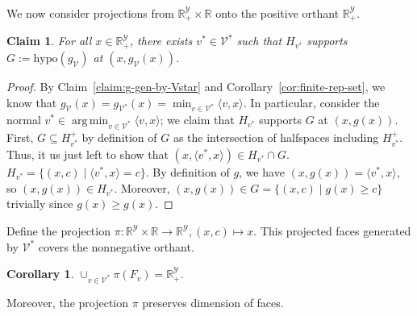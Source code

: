 \documentclass[11pt]{article}
\newcommand{\Comments}{1}
\newcommand{\mynote}[2]{\ifnum\Comments=1\textcolor{#1}{#2}\fi}
\newcommand{\jessie}[1]{\mynote{teal}{[JF: #1]}}
\newcommand{\reals}{\mathbb{R}}
\newcommand{\V}{\mathcal{V}}
\newcommand{\Y}{\mathcal{Y}}
\newcommand{\inprod}[2]{\langle #1, #2 \rangle}%
\newcommand{\hyp}{\mathrm{hypo}}
\DeclareMathOperator*{\argmin}{arg\,min}
\newtheorem{corollary}{Corollary}
\newtheorem{claim}{Claim}
\begin{document}
We now consider projections from $\reals^\Y_+ \times \reals$ onto the positive orthant $\reals^\Y_+$.

\begin{claim}\label{claim:vstar-supporting-G}
	For all $x\in\reals^\Y_+$, there exists $v^*\in\V^*$ such that $H_{v^*}$ supports $G := \hyp(g_\V)$ at $(x,g_\V(x))$.
\end{claim}
\begin{proof}
	By Claim~\ref{claim:g-gen-by-Vstar} and Corollary~\ref{cor:finite-rep-set}, we know that $g_\V(x) = g_{\V^*}(x) = \min_{v \in \V^*}\inprod{v}{x}$.
	In particular, consider the normal $v^* \in \argmin_{v \in \V^*}\inprod{v}{x}$; we claim that $H_{v^*}$ supports $G$ at $(x,g(x))$.
	First, $G \subseteq H^+_{v^*}$ by definition of $G$ as the intersection of halfspaces including $H^+_{v^*}$.
	Thus, it us just left to show that $(x, \inprod{v^*}{x}) \in H_{v^*} \cap G$.
	$H_{v^*} = \{(x,c) \mid \inprod{v^*}{x} = c\}$.
	By definition of $g$, we have $(x,g(x)) = \inprod{v^*}{x}$, so $(x,g(x)) \in H_{v^*}$.
	Moreover, $(x,g(x)) \in G = \{(x,c) \mid g(x) \geq c\}$ trivially since $g(x) \geq g(x)$.
\end{proof}

Define the projection $\pi:\reals^\Y\times \reals \to \reals^\Y, (x,c) \mapsto x$.
This projected faces generated by $\V^*$ covers the nonnegative orthant.
\begin{corollary}\label{cor:projected-Vstar-faces-cover-pos-orthant}
	$\cup_{v\in\V^*} \pi(F_v) = \reals^\Y_+$.
\end{corollary}

Moreover, the projection $\pi$ preserves dimension of faces.
\end{document}
